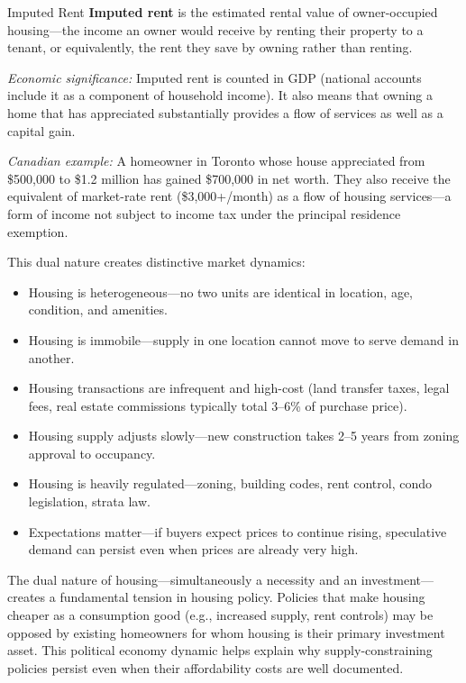\begin{defbox}{Imputed Rent}
\textbf{Imputed rent} is the estimated rental value of owner-occupied housing---the income an owner would receive by renting their property to a tenant, or equivalently, the rent they save by owning rather than renting.

\textit{Economic significance:} Imputed rent is counted in GDP (national accounts include it as a component of household income). It also means that owning a home that has appreciated substantially provides a flow of services as well as a capital gain.

\textit{Canadian example:} A homeowner in Toronto whose house appreciated from \$500,000 to \$1.2 million has gained \$700,000 in net worth. They also receive the equivalent of market-rate rent (\$3,000+/month) as a flow of housing services---a form of income not subject to income tax under the principal residence exemption.
\end{defbox}

This dual nature creates distinctive market dynamics:

\begin{itemize}
  \item Housing is heterogeneous---no two units are identical in location, age, condition, and amenities.
  \item Housing is immobile---supply in one location cannot move to serve demand in another.
  \item Housing transactions are infrequent and high-cost (land transfer taxes, legal fees, real estate commissions typically total 3--6\% of purchase price).
  \item Housing supply adjusts slowly---new construction takes 2--5 years from zoning approval to occupancy.
  \item Housing is heavily regulated---zoning, building codes, rent control, condo legislation, strata law.
  \item Expectations matter---if buyers expect prices to continue rising, speculative demand can persist even when prices are already very high.
\end{itemize}

\begin{keytakeaway}
The dual nature of housing---simultaneously a necessity and an investment---creates a fundamental tension in housing policy. Policies that make housing cheaper as a consumption good (e.g., increased supply, rent controls) may be opposed by existing homeowners for whom housing is their primary investment asset. This political economy dynamic helps explain why supply-constraining policies persist even when their affordability costs are well documented.
\end{keytakeaway}

